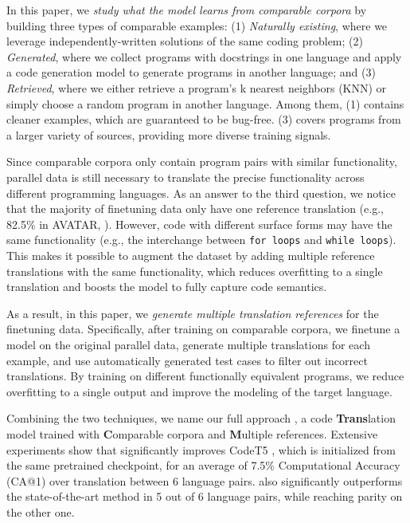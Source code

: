 In this paper, we \emph{study what the model learns from comparable corpora} by building three types of comparable examples:
(1) \emph{Naturally existing}, where we leverage independently-written solutions of the same coding problem;
(2) \emph{Generated}, where we collect programs with docstrings in one language and apply a code generation model to generate programs in another language; and
(3) \emph{Retrieved}, where we either retrieve a program's k nearest neighbors (KNN) or simply choose a random program in another language.
Among them, (1) contains cleaner examples, which are guaranteed to be bug-free. (3) covers programs from a larger variety of sources, providing more diverse training signals.

Since comparable corpora only contain program pairs with similar functionality, parallel data is still necessary to translate the precise functionality across different programming languages. 
As an answer to the third question, we notice that the majority of finetuning data only have one reference translation (e.g., 82.5\% in AVATAR, \citealt{avatar}).
However, code with different surface forms may have the same functionality (e.g., the interchange between \texttt{for loops} and \texttt{while loops}).
This makes it possible to augment the dataset by adding multiple reference translations with the same functionality, which reduces overfitting to a single translation and boosts the model to fully capture code semantics.

As a result, in this paper, we \emph{generate multiple translation references} for the finetuning data.
Specifically, after training on comparable corpora, we finetune a model on the original parallel data, generate multiple translations for each example, and use automatically generated test cases to filter out incorrect translations.
By training on different functionally equivalent programs, we reduce overfitting to a single output and improve the modeling of the target language.


Combining the two techniques, we name our full approach \cmtransours, a code \textbf{Trans}lation model trained with \textbf{C}omparable corpora and \textbf{M}ultiple references.
Extensive experiments show that \cmtransours significantly improves CodeT5 \cite{codet5}, which is initialized from the same pretrained checkpoint, for an average of 7.5\% Computational Accuracy (CA@1) over translation between 6 language pairs.
\cmtransours also significantly outperforms the state-of-the-art method in 5 out of 6 language pairs, while reaching parity on the other one.


